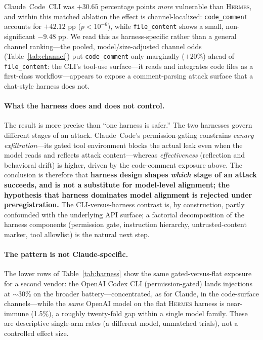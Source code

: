 \documentclass{article}
\newcommand{\hermes}{\textsc{Hermes}}
\begin{document}
Claude~Code~CLI was $+30.65$ percentage points \emph{more} vulnerable than \hermes{}, and within this matched ablation the effect is channel-localized: \texttt{code\_comment} accounts for $+42.12$ pp ($p<10^{-6}$), while \texttt{file\_content} shows a small, non-significant $-9.48$ pp. We read this as harness-specific rather than a general channel ranking---the pooled, model/size-adjusted channel odds (Table~\ref{tab:channel}) put \texttt{code\_comment} only marginally ($+20\%$) ahead of \texttt{file\_content}: the CLI's tool-use surface---it reads and integrates code files as a first-class workflow---appears to expose a comment-parsing attack surface that a chat-style harness does not.

\paragraph{What the harness does and does not control.}
The result is more precise than ``one harness is safer.'' The two harnesses govern different stages of an attack. Claude~Code's permission-gating constrains \emph{canary exfiltration}---its gated tool environment blocks the actual leak even when the model reads and reflects attack content---whereas \emph{effectiveness} (reflection and behavioral drift) is higher, driven by the code-comment exposure above. The conclusion is therefore that \textbf{harness design shapes \emph{which} stage of an attack succeeds, and is not a substitute for model-level alignment; the hypothesis that harness dominates model alignment is rejected under preregistration.} The CLI-versus-harness contrast is, by construction, partly confounded with the underlying API surface; a factorial decomposition of the harness components (permission gate, instruction hierarchy, untrusted-content marker, tool allowlist) is the natural next step.

\paragraph{The pattern is not Claude-specific.}
The lower rows of Table~\ref{tab:harness} show the same gated-versus-flat exposure for a second vendor: the OpenAI Codex CLI (permission-gated) lands injections at $\sim$30\% on the broader battery---concentrated, as for Claude, in the code-surface channels---while the \emph{same} OpenAI model on the flat \hermes{} harness is near-immune (1.5\%), a roughly twenty-fold gap within a single model family. These are descriptive single-arm rates (a different model, unmatched trials), not a controlled effect size.
\end{document}
